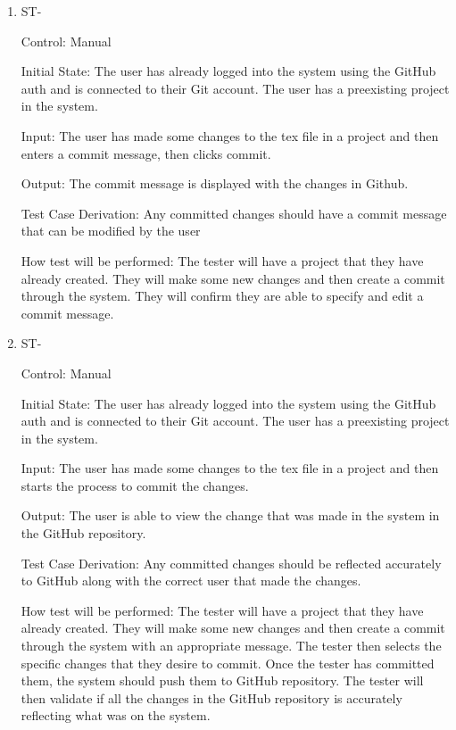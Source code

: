 \documentclass[12pt, titlepage]{article}
\newcounter{TESTID}
\newcommand\TESTNUM{\stepcounter{TESTID}\theTESTID}
\begin{document}
\begin{enumerate}
		\item{ST-\TESTNUM\\}
		
		Control: Manual
		
		Initial State: The user has already logged into the system using the GitHub auth and is connected to their Git account. The user has a preexisting project in the system.
		
		Input: The user has made some changes to the tex file in a project and then enters a commit message, then clicks commit.
		
		Output: The commit message is displayed with the changes in Github. 
		
		Test Case Derivation: Any committed changes should have a commit message that can be modified by the user
		
		How test will be performed: The tester will have a project that they have already created. They will make some new changes and then create a commit through the system. They will confirm they are able to specify and edit a commit message.
		
		\item{ST-\TESTNUM\\}
		
		Control: Manual
		
		Initial State: The user has already logged into the system using the GitHub auth and is connected to their Git account. The user has a preexisting project in the system.
		
		Input: The user has made some changes to the tex file in a project and then starts the process to commit the changes. 
		
		Output: The user is able to view the change that was made in the system in the GitHub repository. 
		
		Test Case Derivation: Any committed changes should be reflected accurately to GitHub along with the correct user that made the changes.
		
		How test will be performed: The tester will have a project that they have already created. They will make some new changes and then create a commit through the system with an appropriate message. The tester then selects the specific changes that they desire to commit. Once the tester has committed them, the system should push them to GitHub repository. The tester will then validate if all the changes in the GitHub repository is accurately reflecting what was on the system. 
		
	\end{enumerate}
	
\end{document}
